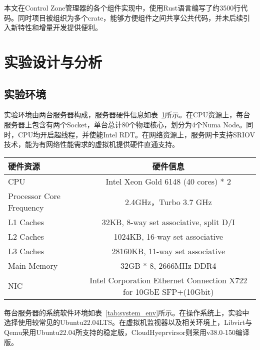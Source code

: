 本文在Control Zone管理器的各个组件实现中，使用Rust语言编写了约3500行代码。同时项目被组织为多个crate，能够方便组件之间共享公共代码，并未后续引入新特性和增量开发提供便利。

\section{实验设计与分析}

\subsection{实验环境}

实验环境由两台服务器构成，服务器硬件信息如表~\ref{tab:exp_env}所示。在CPU资源上，每台服务器上包含有两个Socket，单台总计80个物理核心，划分为4个Numa Node。同时，CPU均开启超线程，并使能Intel RDT。在网络资源上，服务网卡支持SRIOV技术，能为有网络性能需求的虚拟机提供硬件直通支持。

\begin{table}[H]
    \label{tab:exp_env}
    \footnotesize%
    \setlength{\tabcolsep}{4pt}%
    \renewcommand{\arraystretch}{1.25}%
    \centering
    \begin{tabular}{lc}
        \hline
        硬件资源 & 硬件信息 \\
        \hline
        CPU & Intel Xeon Gold 6148 (40 cores) * 2 \\
        Processor Core Frequency & 2.4GHz，Turbo 3.7 GHz \\
        L1 Caches & 32KB,  8-way set associative, split D/I \\
        L2 Caches & 1024KB, 16-way set associative \\
        L3 Caches & 28160KB, 11-way set associative \\
        Main Memory & 32GB * 8, 2666MHz DDR4 \\
        NIC & Intel Corporation Ethernet Connection X722 for 10GbE SFP+(10Gbit) \\
        \hline
    \end{tabular}
\end{table}

每台服务器的系统软件环境如表~\ref{tab:system_env}所示。在操作系统上，实验中选择使用较常见的Ubuntu22.04LTS。在虚拟机监视器以及相关环境上，Libvirt与Qemu采用Ubuntu22.04所支持的稳定版，CloudHyeprvirsor则采用v38.0-150编译版。

